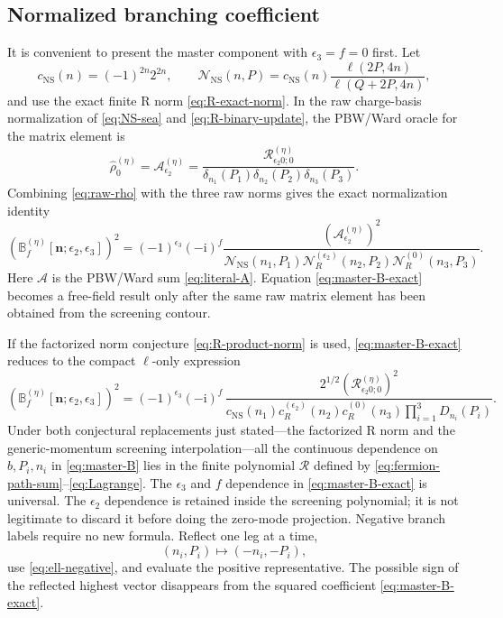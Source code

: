 \documentclass[11pt]{article}
\newcommand{\NS}{\mathrm{NS}}
\newcommand{\cR}{\mathcal R}
\newcommand{\eps}{\epsilon}
\newcommand{\ii}{\mathrm i}
\begin{document}
\subsection{Normalized branching coefficient}

It is convenient to present the master component with $\eps_3=f=0$ first.
Let
\begin{equation}
 c_{\NS}(n)=(-1)^{2n}2^{2n},\qquad
 \mathcal N_{\NS}(n,P)=c_{\NS}(n)
 \frac{\ell(2P,4n)}{\ell(Q+2P,4n)},
 \label{eq:cNS}
\end{equation}
and use the exact finite R norm \eqref{eq:R-exact-norm}.  In the raw
charge-basis normalization of \eqref{eq:NS-sea} and
\eqref{eq:R-binary-update}, the PBW/Ward oracle for the matrix element is
\begin{equation}
 \widehat\rho_0^{(\eta)}
 =\mathcal A_{\eps_2}^{(\eta)}
 =\frac{\cR_{\eps_2 0;0}^{(\eta)}}
 {\delta_{n_1}(P_1)\delta_{n_2}(P_2)\delta_{n_3}(P_3)}.
 \label{eq:raw-rho}
\end{equation}
Combining \eqref{eq:raw-rho} with the three raw norms gives the exact
normalization identity
\begin{equation}
 \boxed{
 \left(\mathbb B_f^{(\eta)}
 [\boldsymbol n;\eps_2,\eps_3]\right)^2
 =(-1)^{\eps_3}(-\ii)^f
 \frac{\left(\mathcal A_{\eps_2}^{(\eta)}\right)^2}
 {\mathcal N_{\NS}(n_1,P_1)
  \mathcal N_R^{(\eps_2)}(n_2,P_2)
  \mathcal N_R^{(0)}(n_3,P_3)}.}
 \label{eq:master-B-exact}
\end{equation}
Here $\mathcal A$ is the PBW/Ward sum \eqref{eq:literal-A}.  Equation
\eqref{eq:master-B-exact} becomes a free-field result only after the same
raw matrix element has been obtained from the screening contour.

If the factorized norm conjecture \eqref{eq:R-product-norm} is used,
\eqref{eq:master-B-exact} reduces to the compact $\ell$-only expression
\begin{equation}
 \boxed{
 \left(\mathbb B_f^{(\eta)}
 [\boldsymbol n;\eps_2,\eps_3]\right)^2
 =(-1)^{\eps_3}(-\ii)^f\,
 \frac{2^{1/2}\left(\cR_{\eps_2 0;0}^{(\eta)}\right)^2}
 {c_{\NS}(n_1)c_R^{(\eps_2)}(n_2)c_R^{(0)}(n_3)
  \prod_{i=1}^3D_{n_i}(P_i)}.}
 \label{eq:master-B}
\end{equation}
Under both conjectural replacements just stated---the factorized R norm and
the generic-momentum screening interpolation---all the continuous dependence
on $b,P_i,n_i$ in \eqref{eq:master-B} lies in the finite polynomial
$\cR$ defined by \eqref{eq:fermion-path-sum}--\eqref{eq:Lagrange}.  The
$\eps_3$ and $f$ dependence in \eqref{eq:master-B-exact} is universal.  The
$\eps_2$ dependence is retained inside the screening polynomial; it is not
legitimate to discard it before doing the zero-mode projection.
Negative branch labels require no new formula.  Reflect one leg at a time,
\begin{equation}
 (n_i,P_i)\longmapsto(-n_i,-P_i),
 \label{eq:R-reflection}
\end{equation}
use \eqref{eq:ell-negative}, and evaluate the positive representative.
The possible sign of the reflected highest vector disappears from the
squared coefficient \eqref{eq:master-B-exact}.
\end{document}
